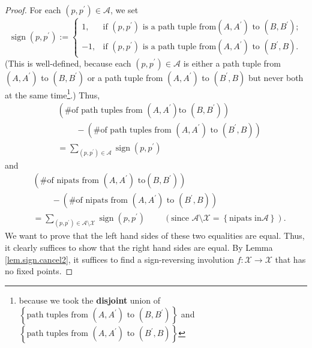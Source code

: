 \begin{definition}
\begin{proof}
For each $\left(  p,p^{\prime}\right)  \in\mathcal{A}$, we set%
\[
\operatorname*{sign}\left(  p,p^{\prime}\right)  :=%
\begin{cases}
1, & \text{if }\left(  p,p^{\prime}\right)  \text{ is a path tuple from
}\left(  A,A^{\prime}\right)  \text{ to }\left(  B,B^{\prime}\right)  ;\\
-1, & \text{if }\left(  p,p^{\prime}\right)  \text{ is a path tuple from
}\left(  A,A^{\prime}\right)  \text{ to }\left(  B^{\prime},B\right)  .
\end{cases}
\]
(This is well-defined, because each $\left(  p,p^{\prime}\right)
\in\mathcal{A}$ is either a path tuple from $\left(  A,A^{\prime}\right)  $ to
$\left(  B,B^{\prime}\right)  $ or a path tuple from $\left(  A,A^{\prime
}\right)  $ to $\left(  B^{\prime},B\right)  $ but never both at the same
time\footnote{because we took the \textbf{disjoint} union of $\left\{
\text{path tuples from }\left(  A,A^{\prime}\right)  \text{ to }\left(
B,B^{\prime}\right)  \right\}  $ and $\left\{  \text{path tuples from }\left(
A,A^{\prime}\right)  \text{ to }\left(  B^{\prime},B\right)  \right\}  $}.)
Thus,
\begin{align*}
&  \left(  \text{\# of path tuples from }\left(  A,A^{\prime}\right)  \text{
to }\left(  B,B^{\prime}\right)  \right) \\
&  \ \ \ \ \ \ \ \ \ \ -\left(  \text{\# of path tuples from }\left(
A,A^{\prime}\right)  \text{ to }\left(  B^{\prime},B\right)  \right) \\
&  =\sum_{\left(  p,p^{\prime}\right)  \in\mathcal{A}}\operatorname*{sign}%
\left(  p,p^{\prime}\right)
\end{align*}
and%
\begin{align*}
&  \left(  \text{\# of nipats from }\left(  A,A^{\prime}\right)  \text{ to
}\left(  B,B^{\prime}\right)  \right) \\
&  \ \ \ \ \ \ \ \ \ \ -\left(  \text{\# of nipats from }\left(  A,A^{\prime
}\right)  \text{ to }\left(  B^{\prime},B\right)  \right) \\
&  =\sum_{\left(  p,p^{\prime}\right)  \in\mathcal{A}\setminus\mathcal{X}%
}\operatorname*{sign}\left(  p,p^{\prime}\right)  \ \ \ \ \ \ \ \ \ \ \left(
\text{since }\mathcal{A}\setminus\mathcal{X}=\left\{  \text{nipats in
}\mathcal{A}\right\}  \right)  .
\end{align*}
We want to prove that the left hand sides of these two equalities are equal.
Thus, it clearly suffices to show that the right hand sides are equal. By
Lemma \ref{lem.sign.cancel2}, it suffices to find a sign-reversing involution
$f:\mathcal{X}\rightarrow\mathcal{X}$ that has no fixed points.


\end{proof}
\end{definition}
